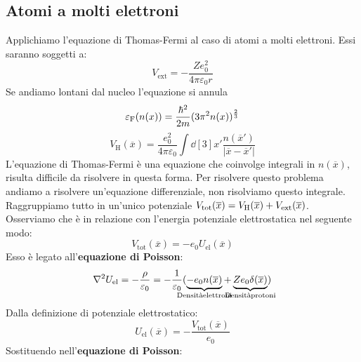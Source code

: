 
\vspace{1.0cm}
\noindent {}

\subsection{Atomi a molti elettroni}
\noindent Applichiamo l'equazione di Thomas-Fermi al caso di atomi a molti elettroni. Essi saranno soggetti a:
\begin{equation*}
    V_{\text{ext}}=-\frac{Ze_0^2}{4\pi\varepsilon_0 r}
\end{equation*}
Se andiamo lontani dal nucleo l'equazione si annula 
\begin{equation*}
    \varepsilon_{\text F}(n(x))=\frac{\hbar^2}{2m}(3\pi^2n(x))^{\frac 23}
\end{equation*}
\begin{equation*}
    V_\text{H}(\overline x)=\frac{e_0^2}{4\pi\varepsilon_0}\int \dd[3]{x'}\frac{n(\overline{x}')}{|\overline x - \overline{x}'|}
\end{equation*}
L'equazione di Thomas-Fermi è una equazione che coinvolge integrali in $n(\overline x)$, risulta difficile da risolvere in questa forma. Per risolvere questo problema andiamo a risolvere un'equazione differenziale, non risolviamo questo integrale.\\
Raggruppiamo tutto in un'unico potenziale $V_\text{tot}(\overline x)=V_{\text H}(\overline x)+V_{\text{ext}}(\overline x)$. Osserviamo che è in relazione con l'energia potenziale elettrostatica nel seguente modo:
\begin{equation*}
    V_\text{tot}(\overline x)=-e_0U_\text{el}(\overline x)
\end{equation*}
Esso è legato all'\textbf{equazione di Poisson}:
\begin{equation*}
    \nabla^2U_\text{el}=-\frac{\rho}{\varepsilon_0}=-\frac 1 {\varepsilon_0}(\underbrace{-e_0n(\overline x)}_{\mathclap{\text{Densità \\ elettroni}}}+\underbrace{Ze_0\delta(\overline x)}_{\mathclap{\text{Densità \\ protoni}}})
\end{equation*}
Dalla definizione di potenziale elettrostatico:
\begin{equation*}
    U_\text{el}(\overline x)=-\frac{V_\text{tot}(\overline x)}{e_0}
\end{equation*}
Sostituendo nell'\textbf{equazione di Poisson}:
